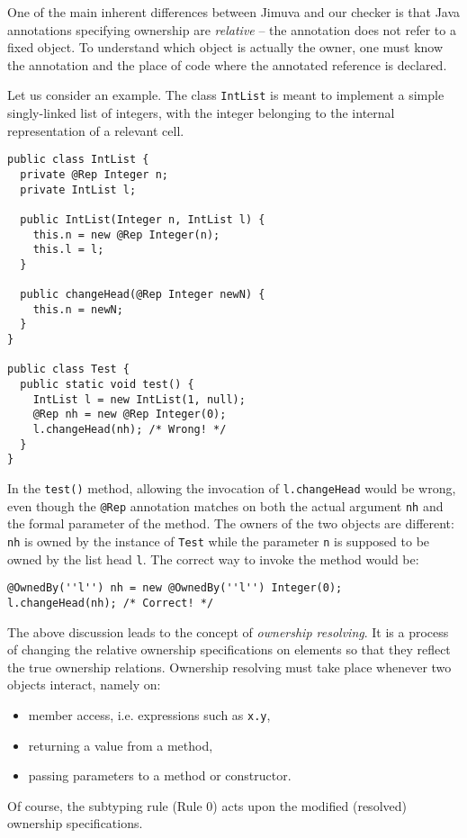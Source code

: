 \documentclass{pracamgr}
\theoremstyle{break}
\theoremstyle{break}
\theoremstyle{break}
\begin{document}
One of the main inherent differences between Jimuva and our checker is
that Java annotations specifying ownership are \emph{relative} -- the
annotation does not refer to a fixed object. To understand which
object is actually the owner, one must know the annotation and the
place of code where the annotated reference is declared.

Let us consider an example. The class \texttt{IntList} is meant to
implement a simple singly-linked list of integers, with the integer
belonging to the internal representation of a relevant cell. 
\begin{lstlisting}
public class IntList {
  private @Rep Integer n;
  private IntList l;

  public IntList(Integer n, IntList l) {
    this.n = new @Rep Integer(n);
    this.l = l;
  }

  public changeHead(@Rep Integer newN) {
    this.n = newN;
  }
}

public class Test {
  public static void test() {
    IntList l = new IntList(1, null);
    @Rep nh = new @Rep Integer(0);
    l.changeHead(nh); /* Wrong! */
  }
}
\end{lstlisting}
In the \texttt{test()} method, allowing the invocation of
\texttt{l.changeHead} would be wrong, even though the \texttt{@Rep}
annotation matches on both the actual argument \texttt{nh} and the
formal parameter of the method. The owners of the two objects are
different: \texttt{nh} is owned by the instance of \texttt{Test} while
the parameter \texttt{n} is supposed to be owned by the list head
\texttt{l}. The correct way to invoke the method would be:
\begin{lstlisting}
@OwnedBy(''l'') nh = new @OwnedBy(''l'') Integer(0);
l.changeHead(nh); /* Correct! */
\end{lstlisting}

The above discussion leads to the concept of \emph{ownership
  resolving}. It is a process of changing the relative ownership
specifications on elements so that they reflect the true ownership
relations. Ownership resolving must take place whenever two objects
interact, namely on:
\begin{itemize}
\item member access, i.e. expressions such as \texttt{x.y},
\item returning a value from a method, 
\item passing parameters to a method or constructor.
\end{itemize}
Of course, the subtyping rule (Rule 0) acts upon the modified
(resolved) ownership specifications.
\end{document}
